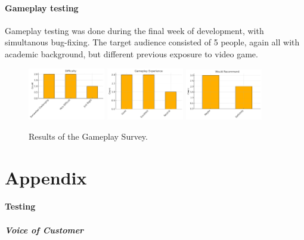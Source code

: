 \documentclass{article}
\begin{document}
\paragraph{Gameplay testing}
Gameplay testing was done during the final week of development, with simultanous bug-fixing. The target audience consisted of 5 people, again all with academic background, but different previous exposure to video game. 
\begin{figure}
    \centering
    \includegraphics[width=0.3\textwidth]{./gp_test1.png}
    \includegraphics[width=0.3\textwidth]{./gp_test2.png}
    \includegraphics[width=0.3\textwidth]{./gp_test3.png}
    \caption{Results of the Gameplay Survey.}
    \label{fig:gp}
\end{figure}




\section{Appendix}

\paragraph{Testing}

\subparagraph{Voice of Customer}

\end{document}
